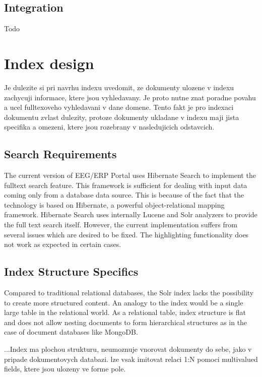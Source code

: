 \documentclass[12pt, oneside, a4paper]{book}
\begin{document}
\section{Integration}

Todo


\chapter{Index design}

Je dulezite si pri navrhu indexu uvedomit, ze dokumenty
ulozene v indexu zachycuji informace, ktere jsou vyhledavany. Je proto
nutne znat poradne povahu a ucel fulltexoveho vyhledavani
v dane domene. Tento fakt je pro indexaci dokumentu zvlast
dulezity, protoze dokumenty ukladane v indexu maji jista specifika
a omezeni, ktere jsou rozebrany v nasledujicich odstavcich.


\section{Search Requirements}

The current version of EEG/ERP Portal uses Hibernate Search to implement
the fulltext search feature. This framework is sufficient for dealing
with input data coming only from a database data source. This is because
of the fact that the technology is based on Hibernate, a powerful
object-relational mapping framework. Hibernate Search uses internally
Lucene and Solr analyzers to provide the full text search itself.
However, the current implementation suffers from several issues which
are desired to be fixed. The highlighting functionality does not work
as expected in certain cases. 


\section{Index Structure Specifics}

Compared to traditional relational databases, the Solr index lacks
the possibility to create more structured content. An analogy to the
index would be a single large table in the relational world. As a
relational table, index structure is flat and does not allow nesting
documents to form hierarchical structures as in the case of document
databases like MongoDB.

...Index ma plochou strukturu, neumoznuje vnorovat dokumenty
do sebe, jako v pripade dokumentovych databazi. lze vsak imitovat
relaci 1:N pomoci multivalued fields, ktere jsou ulozeny ve forme
pole.
\end{document}
